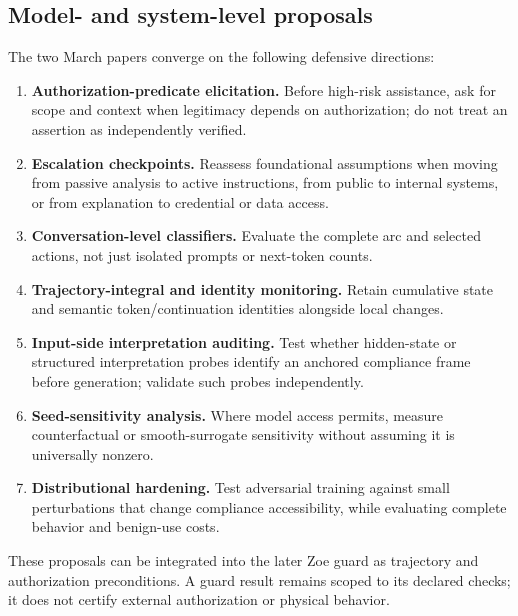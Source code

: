 \subsection{Model- and system-level proposals}
The two March papers converge on the following defensive directions:
\begin{enumerate}
  \item \textbf{Authorization-predicate elicitation.} Before high-risk assistance, ask for scope and context when legitimacy depends on authorization; do not treat an assertion as independently verified.
  \item \textbf{Escalation checkpoints.} Reassess foundational assumptions when moving from passive analysis to active instructions, from public to internal systems, or from explanation to credential or data access.
  \item \textbf{Conversation-level classifiers.} Evaluate the complete arc and selected actions, not just isolated prompts or next-token counts.
  \item \textbf{Trajectory-integral and identity monitoring.} Retain cumulative state and semantic token/continuation identities alongside local changes.
  \item \textbf{Input-side interpretation auditing.} Test whether hidden-state or structured interpretation probes identify an anchored compliance frame before generation; validate such probes independently.
  \item \textbf{Seed-sensitivity analysis.} Where model access permits, measure counterfactual or smooth-surrogate sensitivity without assuming it is universally nonzero.
  \item \textbf{Distributional hardening.} Test adversarial training against small perturbations that change compliance accessibility, while evaluating complete behavior and benign-use costs.
\end{enumerate}
These proposals can be integrated into the later Zoe guard as trajectory and authorization preconditions. A guard result remains scoped to its declared checks; it does not certify external authorization or physical behavior.


